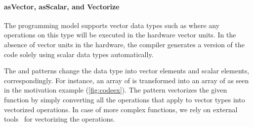 

\paragraph{{\footnotesize as}Vector, {\footnotesize as}Scalar, and Vectorize}
The \OpenCL programming model supports vector data types such as  where any operations on this type will be executed in the hardware vector units.
In the absence of vector units in the hardware, the \OpenCL compiler generates a version of the code solely using scalar data types automatically.

The \asVector and \asScalar patterns change the data type into vector elements and scalar elements, correspondingly.
For instance, an array of  is transformed into an array of  as seen in the motivation example (\autoref{fig:codeex}).
The \vect pattern vectorizes the given function by simply converting all the operations that apply to vector types into vectorized operations.
In case of more complex functions, we rely on external tools~\cite{KarrenbergHa2011} for vectorizing the operations.

